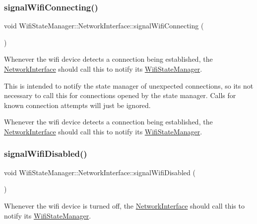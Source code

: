 \subsubsection{\texorpdfstring{signal\+Wifi\+Connecting()}{signalWifiConnecting()}}
{\footnotesize\ttfamily void Wifi\+State\+Manager\+::\+Network\+Interface\+::signal\+Wifi\+Connecting (\begin{DoxyParamCaption}{ }\end{DoxyParamCaption})\hspace{0.3cm}{\ttfamily [protected]}}

Whenever the wifi device detects a connection being established, the \mbox{\hyperlink{classWifiStateManager_1_1NetworkInterface}{Network\+Interface}} should call this to notify its \mbox{\hyperlink{classWifiStateManager}{Wifi\+State\+Manager}}.

This is intended to notify the state manager of unexpected connections, so it\textquotesingle{}s not necessary to call this for connections opened by the state manager. Calls for known connection attempts will just be ignored.

Whenever the wifi device detects a connection being established, the \mbox{\hyperlink{classWifiStateManager_1_1NetworkInterface}{Network\+Interface}} should call this to notify its \mbox{\hyperlink{classWifiStateManager}{Wifi\+State\+Manager}}. \mbox{\label{classWifiStateManager_1_1NetworkInterface_a523c3139b607afe2fb92d66218c1b88d}} 
\subsubsection{\texorpdfstring{signal\+Wifi\+Disabled()}{signalWifiDisabled()}}
{\footnotesize\ttfamily void Wifi\+State\+Manager\+::\+Network\+Interface\+::signal\+Wifi\+Disabled (\begin{DoxyParamCaption}{ }\end{DoxyParamCaption})\hspace{0.3cm}{\ttfamily [protected]}}

Whenever the wifi device is turned off, the \mbox{\hyperlink{classWifiStateManager_1_1NetworkInterface}{Network\+Interface}} should call this to notify its \mbox{\hyperlink{classWifiStateManager}{Wifi\+State\+Manager}}.

